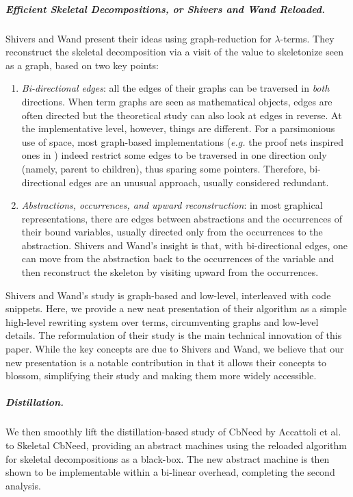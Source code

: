 \documentclass[10pt,a4paper]{article}
\theoremstyle{remark}
\renewcommand{\l}{\lambda}
\newcommand{\eg}{{\em e.g.}\xspace}
\newcommand{\cbneed}{CbNeed\xspace}
\begin{document}
\subparagraph{Efficient Skeletal Decompositions, or Shivers and Wand Reloaded.} Shivers and Wand present their ideas using graph-reduction for $\l$-terms. They reconstruct the skeletal decomposition via a visit of the value to skeletonize seen as a graph, based on two key points:
\begin{enumerate}
\item \emph{Bi-directional edges}: all the edges of their graphs can be traversed in \emph{both} directions. When term graphs are seen as mathematical objects, edges are often directed but the theoretical study can also look at edges in reverse. At the implementative level, however, things are different. For a parsimonious use of space, most graph-based implementations (\eg the proof nets inspired ones in \cite{DBLP:conf/ppdp/AccattoliB17,DBLP:conf/lics/AccattoliCC21,DBLP:conf/fscd/AccattoliC24}) indeed restrict some edges to be traversed in one direction only (namely, parent to children), thus sparing some pointers. Therefore, bi-directional edges are an unusual approach, usually considered redundant.

\item \emph{Abstractions, occurrences, and upward reconstruction}: in most graphical representations, there are edges between abstractions and the occurrences of their bound variables, usually directed only from the occurrences to the abstraction. Shivers and Wand's insight is that, with bi-directional edges, one can move from the abstraction back to the occurrences of the variable and then reconstruct the skeleton by visiting upward from the occurrences.
\end{enumerate}
Shivers and Wand's study is graph-based and low-level, interleaved with code snippets. 
Here, we provide a new neat presentation of their algorithm as a simple high-level rewriting system over terms, circumventing graphs and low-level details. The reformulation of their study is the main technical innovation of this paper. While the key concepts are due to Shivers and Wand, we believe that our new presentation is a notable contribution in that it allows their concepts to blossom, simplifying their study and making them more widely accessible. 


\subparagraph{Distillation.} We then smoothly lift the distillation-based study of \cbneed by Accattoli et al. \cite{DBLP:conf/icfp/AccattoliBM14} to Skeletal \cbneed, providing an abstract machines using the reloaded  algorithm for skeletal decompositions as a black-box. The new abstract machine is then shown to be implementable within a bi-linear overhead, completing the second analysis.
\end{document}
